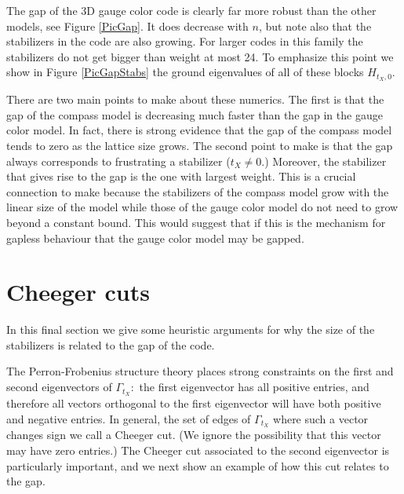\documentclass[12pt]{article}
\begin{document}
The gap of the 3D gauge color code is clearly far more
robust than the other models, see Figure \ref{PicGap}.
It does decrease with $n$, but note also that the
stabilizers in the code are also growing.
For larger codes in this family the stabilizers do not get
bigger than weight at most 24.
To emphasize this point we show in Figure \ref{PicGapStabs}
the ground eigenvalues of all of these blocks $H_{t_X,0}.$

There are two main points to make about these numerics.
The first is that the gap of the compass model 
is decreasing much faster than the gap in the gauge color model.
In fact, there is strong evidence \cite{Dorier2005} 
that the gap of the compass model
tends to zero as the lattice size grows.
The second point to make
is that the gap always corresponds to frustrating
a stabilizer ($t_X\ne 0.$) 
Moreover, the stabilizer that
gives rise to the gap is the one with largest weight.
This is a crucial connection to make because the
stabilizers of the compass model grow with the linear
size of the model
while those of the gauge color model
do not need to grow beyond a constant bound.
This would suggest that if this is the mechanism for
gapless behaviour that the gauge color model may
be gapped.

\section{Cheeger cuts}

In this final section 
we give some heuristic
arguments for why the size of the stabilizers is
related to the gap of the code. 

The Perron-Frobenius structure theory places
strong constraints on the first and second
eigenvectors of $\Gamma_{t_X}:$
the first eigenvector has all positive entries,
and therefore all vectors orthogonal to the first
eigenvector will have both positive and negative entries.
In general, the set of edges of $\Gamma_{t_X}$ where
such a vector changes sign we call a Cheeger cut.
(We ignore the possibility that this vector
may have zero entries.)
The Cheeger cut associated to the second eigenvector
is particularly important, and we next show an
example of how this cut relates to the gap.
\end{document}
